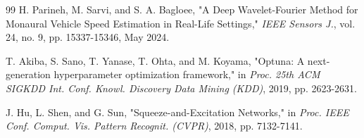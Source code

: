 \documentclass[conference]{IEEEtran}
\begin{document}
\begin{thebibliography}{99}
H. Parineh, M. Sarvi, and S. A. Bagloee, "A Deep Wavelet-Fourier Method for Monaural Vehicle Speed Estimation in Real-Life Settings," \textit{IEEE Sensors J.}, vol. 24, no. 9, pp. 15337-15346, May 2024.

T. Akiba, S. Sano, T. Yanase, T. Ohta, and M. Koyama, "Optuna: A next-generation hyperparameter optimization framework," in \textit{Proc. 25th ACM SIGKDD Int. Conf. Knowl. Discovery Data Mining (KDD)}, 2019, pp. 2623-2631.

J. Hu, L. Shen, and G. Sun, "Squeeze-and-Excitation Networks," in \textit{Proc. IEEE Conf. Comput. Vis. Pattern Recognit. (CVPR)}, 2018, pp. 7132-7141.

\end{thebibliography}
\end{document}
